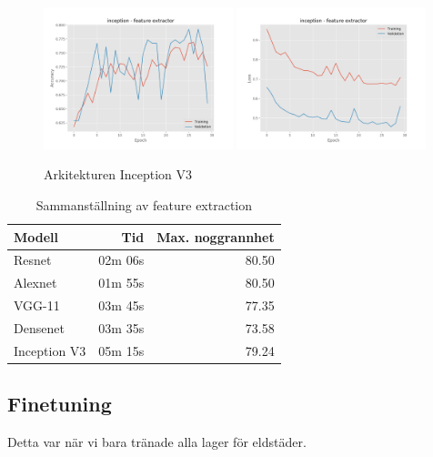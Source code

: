 \documentclass{kththesis}
\begin{document}
  \begin{figure}
    \centering
    \includegraphics[width=0.49\textwidth]{"./fireplace/fireplace-classification - acc - inception - feature extractor"}
    \includegraphics[width=0.49\textwidth]{"./fireplace/fireplace-classification - loss - inception - feature extractor"}
    \caption{Arkitekturen Inception V3}
  \end{figure}

  \begin{table}
    \centering
    \begin{tabular}{|l|r|r|}
      Modell & Tid & Max. noggrannhet \\ 
      \hline
      Resnet       & 02m 06s & 80.50 \\
      Alexnet      & 01m 55s & 80.50 \\
      VGG-11       & 03m 45s & 77.35 \\
      Densenet     & 03m 35s & 73.58 \\
      Inception V3 & 05m 15s & 79.24 \\
    \end{tabular}
    \caption{Sammanställning av feature extraction} \label{tab:sometab}
  \end{table}

  \subsection{Finetuning}
  Detta var när vi bara tränade alla lager för eldstäder.
\end{document}
